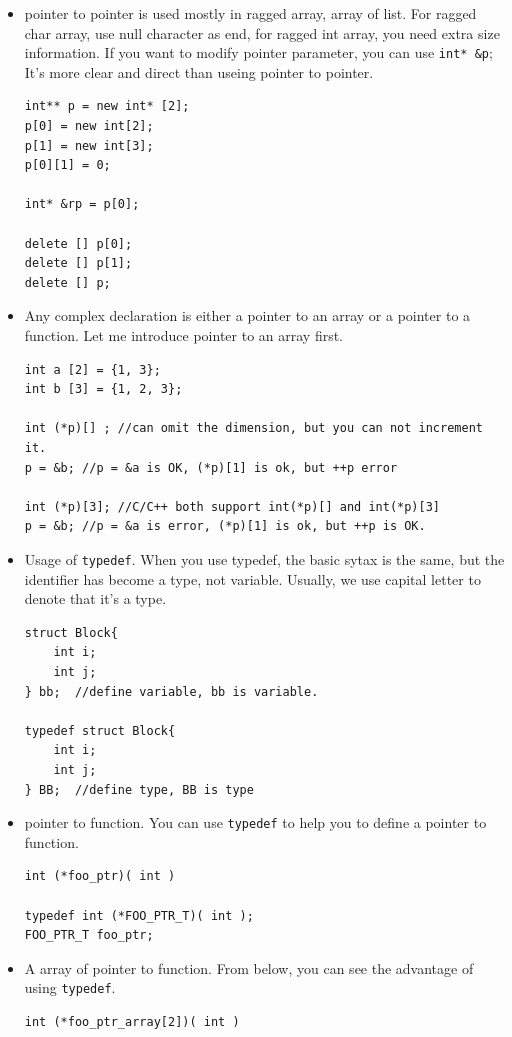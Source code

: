 \documentclass[a4paper,11pt,twoside]{book}
\begin{document}
\begin{itemize}	
	\item pointer to pointer is used mostly in ragged array, array of list. For ragged char array, use null character as end, for ragged int array, you need extra size information. If you want to modify pointer parameter, you can use \texttt{int* \&p}; It's more clear and direct than useing pointer to pointer. 
\begin{lstlisting}
int** p = new int* [2];
p[0] = new int[2];
p[1] = new int[3];
p[0][1] = 0;

int* &rp = p[0]; 

delete [] p[0];
delete [] p[1];
delete [] p;		
\end{lstlisting}
	
		\item Any complex declaration is either a pointer to an array or a pointer to a function. Let me introduce pointer to an array first. 
\begin{lstlisting}
int a [2] = {1, 3};
int b [3] = {1, 2, 3};

int (*p)[] ; //can omit the dimension, but you can not increment it.
p = &b; //p = &a is OK, (*p)[1] is ok, but ++p error

int (*p)[3]; //C/C++ both support int(*p)[] and int(*p)[3]
p = &b; //p = &a is error, (*p)[1] is ok, but ++p is OK.
\end{lstlisting}
	
	\item Usage of \texttt{typedef}. When you use typedef, the basic sytax is the same, but the identifier has become a type, not variable. Usually, we use capital letter to denote that it's a type.
\begin{lstlisting}[]
struct Block{
	int i;
	int j;
} bb;  //define variable, bb is variable.

typedef struct Block{
	int i;
	int j;
} BB;  //define type, BB is type 
\end{lstlisting}
	
	\item pointer to function. You can use \texttt{typedef} to help you to define a pointer to function.
\begin{lstlisting}
int (*foo_ptr)( int )

typedef int (*FOO_PTR_T)( int );
FOO_PTR_T foo_ptr;
\end{lstlisting}
	
	\item A array of pointer to function. From below, you can see the advantage of using \texttt{typedef}.
\begin{lstlisting}
int (*foo_ptr_array[2])( int )


\end{lstlisting}
\end{itemize}
\end{document}
